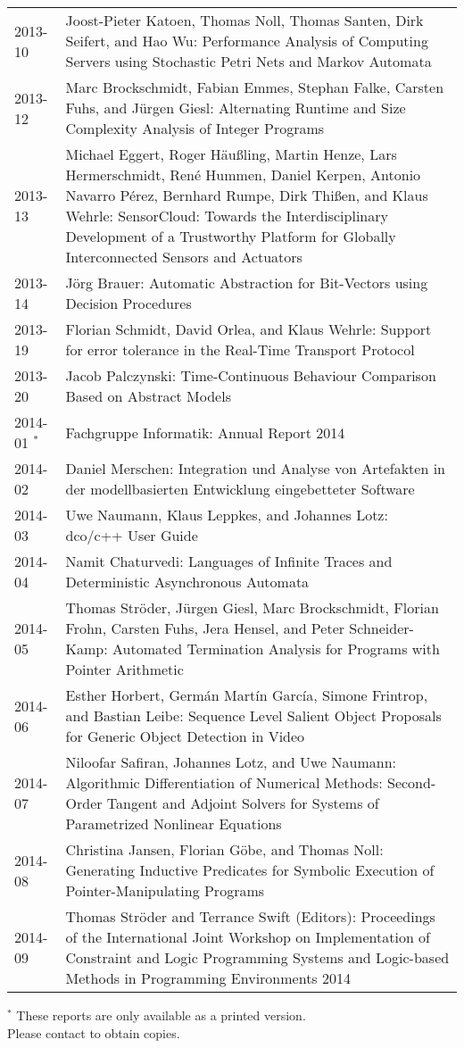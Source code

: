 \documentclass[color]{aib}
\begin{document}
\begin{longtable}{lp{11cm}}
2013-10 & Joost-Pieter Katoen, Thomas Noll, Thomas Santen, Dirk Seifert, and Hao Wu:         Performance Analysis of Computing Servers using Stochastic Petri Nets and Markov Automata\\
2013-12 & Marc Brockschmidt, Fabian Emmes, Stephan Falke, Carsten Fuhs, and J\"{u}rgen Giesl:         Alternating Runtime and Size Complexity Analysis of Integer Programs\\
2013-13 & Michael Eggert, Roger H\"{a}u\ss{}ling, Martin Henze, Lars Hermerschmidt, Ren\'{e} Hummen, Daniel Kerpen, Antonio Navarro P\'{e}rez, Bernhard Rumpe, Dirk Thi\ss{}en, and Klaus Wehrle:         SensorCloud: Towards the Interdisciplinary Development of a Trustworthy Platform for Globally Interconnected Sensors and Actuators\\
2013-14 & J\"{o}rg Brauer:         Automatic Abstraction for Bit-Vectors using Decision Procedures\\
2013-19 & Florian Schmidt, David Orlea, and Klaus Wehrle:         Support for error tolerance in the Real-Time Transport Protocol\\
2013-20 & Jacob Palczynski:         Time-Continuous Behaviour Comparison Based on Abstract Models\\
2014-01 $^\ast$ &Fachgruppe Informatik:      Annual Report 2014\\
2014-02 & Daniel Merschen:         Integration und Analyse von Artefakten in der modellbasierten Entwicklung eingebetteter Software\\
2014-03 & Uwe Naumann, Klaus Leppkes, and Johannes Lotz:         dco/c++ User Guide\\
2014-04 & Namit Chaturvedi:         Languages of Infinite Traces and Deterministic Asynchronous Automata\\
2014-05 & Thomas Str\"{o}der, J\"{u}rgen Giesl, Marc Brockschmidt, Florian Frohn, Carsten Fuhs, Jera Hensel, and Peter Schneider-Kamp:         Automated Termination Analysis for Programs with Pointer Arithmetic\\
2014-06 & Esther Horbert, Germ\'{a}n Mart\'{i}n Garc\'{i}a, Simone Frintrop, and Bastian Leibe:         Sequence Level Salient Object Proposals for Generic Object Detection in Video\\
2014-07 & Niloofar Safiran, Johannes Lotz, and Uwe Naumann:         Algorithmic Differentiation of Numerical Methods: Second-Order Tangent and Adjoint Solvers for Systems of Parametrized Nonlinear Equations\\
2014-08 & Christina Jansen, Florian G\"{o}be, and Thomas Noll:         Generating Inductive Predicates for Symbolic Execution of Pointer-Manipulating Programs\\
2014-09 & Thomas Str\"{o}der and Terrance Swift (Editors):         Proceedings of the International Joint Workshop on Implementation of Constraint and Logic Programming Systems and Logic-based Methods in Programming Environments 2014\\

\end{longtable}
\bigskip

\noindent
{\small $^\ast$ These reports are only available as a printed version.\\
  Please contact  to obtain
  copies.}
 
\end{document}
